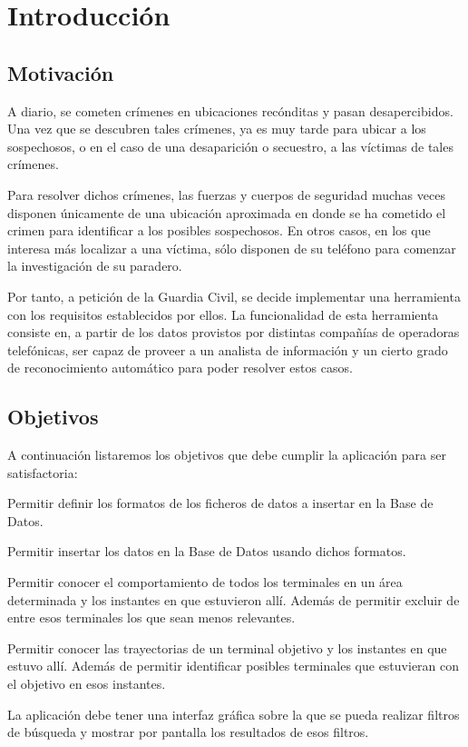 \chapter{Introducción\label{CAP:INTRODUCCION}}
  
  \section{Motivación\label{SEC:MOTIVACION}}
    A diario, se cometen crímenes en ubicaciones recónditas y pasan desapercibidos. Una vez que se descubren tales crímenes, ya es muy tarde para ubicar a los sospechosos, o en el caso de una desaparición o secuestro, a las víctimas de tales crímenes.
    
    Para resolver dichos crímenes, las fuerzas y cuerpos de seguridad muchas veces disponen únicamente de una ubicación aproximada en donde se ha cometido el crimen para identificar a los posibles sospechosos. En otros casos, en los que interesa más localizar a una víctima, sólo disponen de su teléfono para comenzar la investigación de su paradero.
    
    Por tanto, a petición de la Guardia Civil, se decide implementar una herramienta con los requisitos establecidos por ellos.
    La funcionalidad de esta herramienta consiste en, a partir de los datos provistos por distintas compañías de operadoras telefónicas, ser capaz de proveer a un analista de información y un cierto grado de reconocimiento automático para poder resolver estos casos.
  
  
  \section{Objetivos\label{SEC:OBJETIVOS}}
    A continuación listaremos los objetivos que debe cumplir la aplicación para ser satisfactoria:
    \begin{objetive}
      \item Permitir definir los formatos de los ficheros de datos a insertar en la Base de Datos.
      \item Permitir insertar los datos en la Base de Datos usando dichos formatos.
      
      \item Permitir conocer el comportamiento de todos los terminales en un área determinada y los instantes en que estuvieron allí. Además de permitir excluir de entre esos terminales los que sean menos relevantes.
      
      \item Permitir conocer las trayectorias de un terminal objetivo y los instantes en que estuvo allí. Además de permitir identificar posibles terminales que estuvieran con el objetivo en esos instantes.

      \item La aplicación debe tener una interfaz gráfica sobre la que se pueda realizar filtros de búsqueda y mostrar por pantalla los resultados de esos filtros.
    \end{objetive}
  
